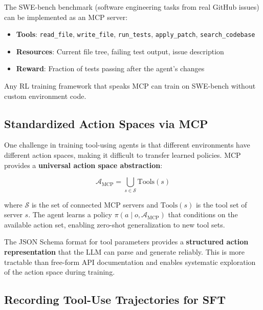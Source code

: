\begin{examplebox}
The SWE-bench benchmark (software engineering tasks from real GitHub issues) can be implemented as an MCP server:

\begin{itemize}
  \item \textbf{Tools}: \texttt{read\_file}, \texttt{write\_file}, \texttt{run\_tests}, \texttt{apply\_patch}, \texttt{search\_codebase}
  \item \textbf{Resources}: Current file tree, failing test output, issue description
  \item \textbf{Reward}: Fraction of tests passing after the agent’s changes
\end{itemize}

Any RL training framework that speaks MCP can train on SWE-bench without custom environment code.
\end{examplebox}

\subsection{Standardized Action Spaces via MCP}
\label{standardized-action-spaces-via-mcp}

One challenge in training tool-using agents is that different environments have different action spaces, making it difficult to transfer learned policies. MCP provides a \textbf{universal action space abstraction}:

\begin{equation}
\mathcal{A}_{\text{MCP}} = \bigcup_{s \in \mathcal{S}} \text{Tools}(s)
\end{equation}

where $\mathcal{S}$ is the set of connected MCP servers and $\text{Tools}(s)$ is the tool set of server $s$. The agent learns a policy $\pi(a \mid o, \mathcal{A}_{\text{MCP}})$ that conditions on the available action set, enabling zero-shot generalization to new tool sets.

The JSON Schema format for tool parameters provides a \textbf{structured action representation} that the LLM can parse and generate reliably. This is more tractable than free-form API documentation and enables systematic exploration of the action space during training.

\subsection{Recording Tool-Use Trajectories for SFT}
\label{recording-tool-use-trajectories-for-sft}

